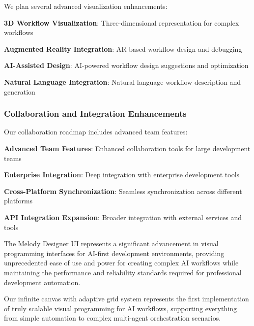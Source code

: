 We plan several advanced visualization enhancements:

\begin{compactlist}
    \item \textbf{3D Workflow Visualization}: Three-dimensional representation for complex workflows
    \item \textbf{Augmented Reality Integration}: AR-based workflow design and debugging
    \item \textbf{AI-Assisted Design}: AI-powered workflow design suggestions and optimization
    \item \textbf{Natural Language Integration}: Natural language workflow description and generation
\end{compactlist}

\subsubsection*{Collaboration and Integration Enhancements}

Our collaboration roadmap includes advanced team features:

\begin{expandedlist}
    \item \textbf{Advanced Team Features}: Enhanced collaboration tools for large development teams
    \item \textbf{Enterprise Integration}: Deep integration with enterprise development tools
    \item \textbf{Cross-Platform Synchronization}: Seamless synchronization across different platforms
    \item \textbf{API Integration Expansion}: Broader integration with external services and tools
\end{expandedlist}

The Melody Designer UI represents a significant advancement in visual programming interfaces for AI-first development environments, providing unprecedented ease of use and power for creating complex AI workflows while maintaining the performance and reliability standards required for professional development automation.
\begin{infobox}[title=Canvas Innovation]
Our infinite canvas with adaptive grid system represents the first implementation of truly scalable visual programming for AI workflows, supporting everything from simple automation to complex multi-agent orchestration scenarios.
\end{infobox}

